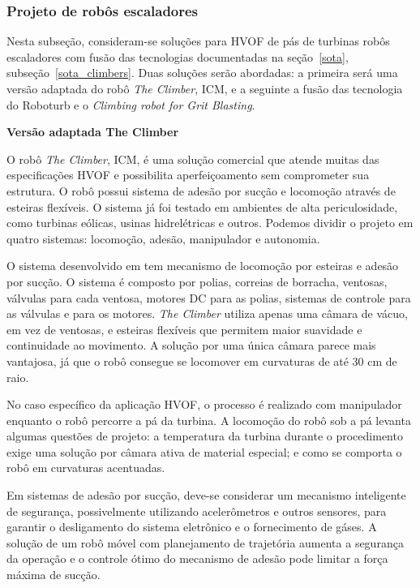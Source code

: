 \subsubsection{Projeto de robôs escaladores}\label{proj_climbers}

Nesta subseção, consideram-se soluções para HVOF de pás de turbinas robôs
escaladores com fusão das tecnologias documentadas na
seção~\ref{sota}, subseção~\ref{sota_climbers}. Duas soluções serão abordadas:
a primeira será uma versão adaptada do robô \emph{The Climber}, ICM, e a
seguinte a fusão das tecnologia do Roboturb e o \emph{Climbing robot for Grit
Blasting}.

\textbf{Versão adaptada The Climber}  

O robô \emph{The Climber}, ICM, é uma solução comercial que atende muitas das
especificações HVOF e possibilita aperfeiçoamento sem comprometer sua
estrutura. O robô possui sistema de adesão por sucção e locomoção através de
esteiras flexíveis. O sistema já foi testado em ambientes de alta
periculosidade, como turbinas eólicas, usinas hidrelétricas e outros. Podemos
dividir o projeto em quatro sistemas: locomoção, adesão, manipulador e autonomia.

O sistema desenvolvido em \cite{kim2008development} tem mecanismo de
locomoção por esteiras e adesão por sucção. O sistema é composto por polias,
correias de borracha, ventosas, válvulas para cada ventosa, motores DC para as polias,
sistemas de controle para as válvulas e para os motores. \emph{The Climber}
utiliza apenas uma câmara de vácuo, em vez de ventosas, e esteiras flexíveis que
permitem maior suavidade e continuidade ao movimento. A solução por uma única
câmara parece mais vantajosa, já que o robô consegue se locomover em curvaturas
de até 30 cm de raio.

No caso específico da aplicação HVOF, o processo é realizado com
manipulador enquanto o robô percorre a pá da turbina. A locomoção do
robô sob a pá levanta algumas questões de projeto: a
temperatura da turbina durante o procedimento exige uma solução por câmara ativa 
de material especial; e como se comporta o robô em curvaturas
acentuadas. 

Em sistemas de adesão por sucção, deve-se considerar um mecanismo
inteligente de segurança, possivelmente utilizando acelerômetros e outros
sensores, para garantir o desligamento do sistema eletrônico e o fornecimento de
gáses. A solução de um robô móvel com planejamento de trajetória aumenta a
segurança da operação e o controle ótimo do mecanismo de adesão pode limitar a força máxima de sucção.

